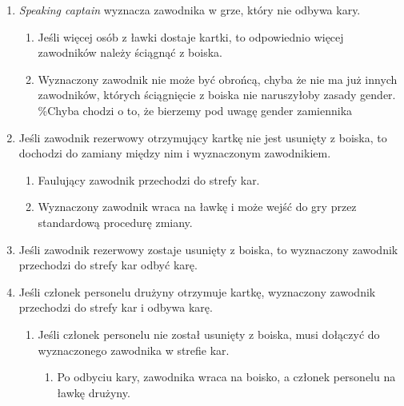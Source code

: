 \documentclass[11pt,a4paper]{article}
\begin{document}
\begin{enumerate}

\item
  \emph{Speaking captain} wyznacza zawodnika w grze, który nie odbywa
  kary.

  \begin{enumerate}
  
  \item
    Jeśli więcej osób z ławki dostaje kartki, to odpowiednio więcej
    zawodników należy ściągnąć z boiska.
  \item
    Wyznaczony zawodnik nie może być obrońcą, chyba że nie ma już innych
    zawodników, których ściągnięcie z boiska nie naruszyłoby zasady
    gender. \%Chyba chodzi o to, że bierzemy pod uwagę gender zamiennika
  \end{enumerate}
\item
  Jeśli zawodnik rezerwowy otrzymujący kartkę nie jest usunięty z
  boiska, to dochodzi do zamiany między nim i wyznaczonym zawodnikiem.

  \begin{enumerate}
  
  \item
    Faulujący zawodnik przechodzi do strefy kar.
  \item
    Wyznaczony zawodnik wraca na ławkę i może wejść do gry przez
    standardową procedurę zmiany.
  \end{enumerate}
\item
  Jeśli zawodnik rezerwowy zostaje usunięty z boiska, to wyznaczony
  zawodnik przechodzi do strefy kar odbyć karę.
\item
  Jeśli członek personelu drużyny otrzymuje kartkę, wyznaczony zawodnik
  przechodzi do strefy kar i odbywa karę.

  \begin{enumerate}
  
  \item
    Jeśli członek personelu nie został usunięty z boiska, musi dołączyć
    do wyznaczonego zawodnika w strefie kar.

    \begin{enumerate}
    
    \item
      Po odbyciu kary, zawodnika wraca na boisko, a członek personelu na
      ławkę drużyny.
    \end{enumerate}
  \end{enumerate}
\end{enumerate}
\end{document}
